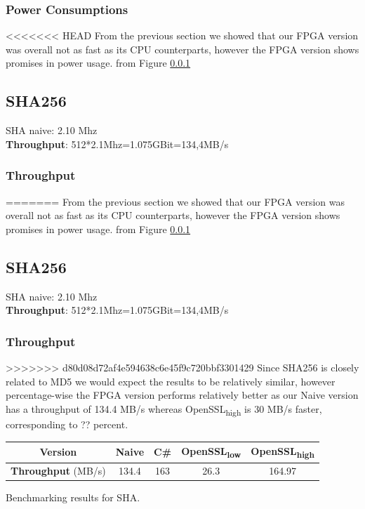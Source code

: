 \documentclass[a4paper]{article}
\begin{document}
\begin{enumerate}
\begin{table}[htbp]
\end{table}
\subsubsection{Power Consumptions}
<<<<<<< HEAD
\label{sec:orgd2b5677}
From the previous section we showed that our FPGA version was overall not as fast as its CPU counterparts, however the FPGA version shows promises in power usage. from Figure \ref{}
\subsection{SHA256}
\label{sec:org8c71538}
SHA naive: 2.10 Mhz\\
\textbf{Throughput}: 512*2.1Mhz=1.075GBit=134,4MB/s
\subsubsection{Throughput}
\label{sec:org739765a}
=======
\label{sec:org6e483de}
From the previous section we showed that our FPGA version was overall not as fast as its CPU counterparts, however the FPGA version shows promises in power usage. from Figure \ref{}
\subsection{SHA256}
\label{sec:org8cab03f}
SHA naive: 2.10 Mhz\\
\textbf{Throughput}: 512*2.1Mhz=1.075GBit=134,4MB/s
\subsubsection{Throughput}
\label{sec:orgfc881d8}
>>>>>>> d80d08d72af4e594638c6e45f9c720bbf3301429
Since SHA256 is closely related to MD5 we would expect the results to be relatively similar, however percentage-wise the FPGA version performs relatively better as our Naive version has a throughput of 134.4 MB/s whereas OpenSSL\textsubscript{high} is 30 MB/s faster, corresponding to ?? percent.
\begin{table}[htbp]
\centering
\begin{tabular}{|c|c|c|c|c|}
\hline
\textbf{Version} & Naive & C\# & OpenSSL\textsubscript{low} & OpenSSL\textsubscript{high}\\
\hline
\textbf{Throughput} (MB/s) & 134.4 & 163 & 26.3 & 164.97\\
\hline
\end{tabular}
Benchmarking results for SHA.

\end{table}


\end{enumerate}
\end{document}
